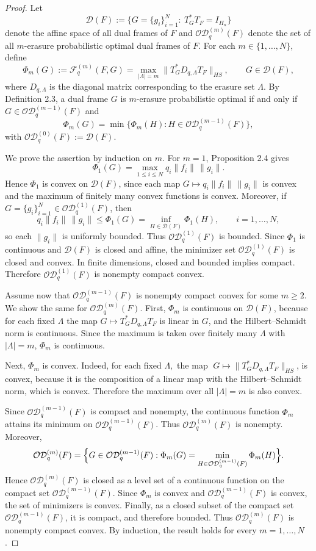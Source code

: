 \documentclass[final,1p,times]{elsarticle}
\begin{document}
\begin{proof}
Let
\[
\mathcal D(F):=\{G=\{g_i\}_{i=1}^N:\ T_G^*T_F=I_{H_n}\}
\]
denote the affine space of all dual frames of $F$ and \(
\mathcal{OD}_q^{(m)}(F)\) denote the set of all $m$-erasure probabilistic optimal dual frames of $F.$ For each $m\in\{1,\dots,N\}$, define
\[
\Phi_m(G):=\mathcal F_q^{(m)}(F,G)
=\max_{|\Lambda|=m}\bigl\|T_G^*D_{q,\Lambda}T_F\bigr\|_{HS},
\qquad G\in\mathcal D(F),
\]
where $D_{q,\Lambda}$ is the diagonal matrix corresponding to the erasure set $\Lambda$.
By Definition 2.3, a dual frame $G$ is $m$-erasure probabilistic optimal if and only if
$G\in \mathcal{OD}_q^{(m-1)}(F)$ and
\[
\Phi_m(G)=\min\{\Phi_m(H): H\in \mathcal{OD}_q^{(m-1)}(F)\},
\]
with $\mathcal{OD}_q^{(0)}(F):=\mathcal D(F)$.

We prove the assertion by induction on $m$. For $m=1$, Proposition 2.4 gives
\[
\Phi_1(G)=\max_{1\le i\le N} q_i\|f_i\|\,\|g_i\|.
\]
Hence $\Phi_1$ is convex on $\mathcal D(F)$, since each map $G\mapsto q_i\|f_i\|\,\|g_i\|$ is convex and the maximum of finitely many convex functions is convex. Moreover, if
$G=\{g_i\}_{i=1}^N\in \mathcal{OD}_q^{(1)}(F)$, then
\[
q_i\|f_i\|\,\|g_i\|\le \Phi_1(G)=\inf_{H\in\mathcal D(F)}\Phi_1(H),
\qquad i=1,\dots,N,
\]
so each $\|g_i\|$ is uniformly bounded. Thus $\mathcal{OD}_q^{(1)}(F)$ is bounded.
Since $\Phi_1$ is continuous and $\mathcal D(F)$ is closed and affine, the minimizer set
$\mathcal{OD}_q^{(1)}(F)$ is closed and convex. In finite dimensions, closed and bounded implies compact. Therefore $\mathcal{OD}_q^{(1)}(F)$ is nonempty compact convex.

Assume now that $\mathcal{OD}_q^{(m-1)}(F)$ is nonempty compact convex for some $m\ge 2$.
We show the same for $\mathcal{OD}_q^{(m)}(F)$. First, $\Phi_m$ is continuous on $\mathcal D(F)$, because for each fixed $\Lambda$ the map $G\mapsto T_G^*D_{q,\Lambda}T_F$ is linear in $G$, and the Hilbert--Schmidt norm is continuous. Since the maximum is taken over finitely many $\Lambda$ with $|\Lambda|=m$, $\Phi_m$ is continuous.

Next, $\Phi_m$ is convex. Indeed, for each fixed $\Lambda,$ the map $ \; G\mapsto \bigl\|T_G^*D_{q,\Lambda}T_F\bigr\|_{HS}$, is convex, because it is the composition of a linear map with the Hilbert--Schmidt norm, which is convex. Therefore the maximum over all $|\Lambda|=m$ is also convex.

Since $\mathcal{OD}_q^{(m-1)}(F)$ is compact and nonempty, the continuous function $\Phi_m$
attains its minimum on $\mathcal{OD}_q^{(m-1)}(F)$. Thus $\mathcal{OD}_q^{(m)}(F)$ is nonempty.
Moreover,
\[
\mathcal{OD}_q^{(m)}(F)
=
\Bigl\{
G\in \mathcal{OD}_q^{(m-1)}(F):
\Phi_m(G)=\min_{H\in \mathcal{OD}_q^{(m-1)}(F)}\Phi_m(H)
\Bigr\}.
\]
Hence $\mathcal{OD}_q^{(m)}(F)$ is closed as a level set of a continuous function on the compact set
$\mathcal{OD}_q^{(m-1)}(F)$. Since $\Phi_m$ is convex and $\mathcal{OD}_q^{(m-1)}(F)$ is convex, the set of minimizers is convex. Finally, as a closed subset of the compact set $\mathcal{OD}_q^{(m-1)}(F)$, it is compact, and therefore bounded. Thus $\mathcal{OD}_q^{(m)}(F)$ is nonempty compact convex. By induction, the result holds for every
$m=1,\dots,N$.
\end{proof}
\end{document}
